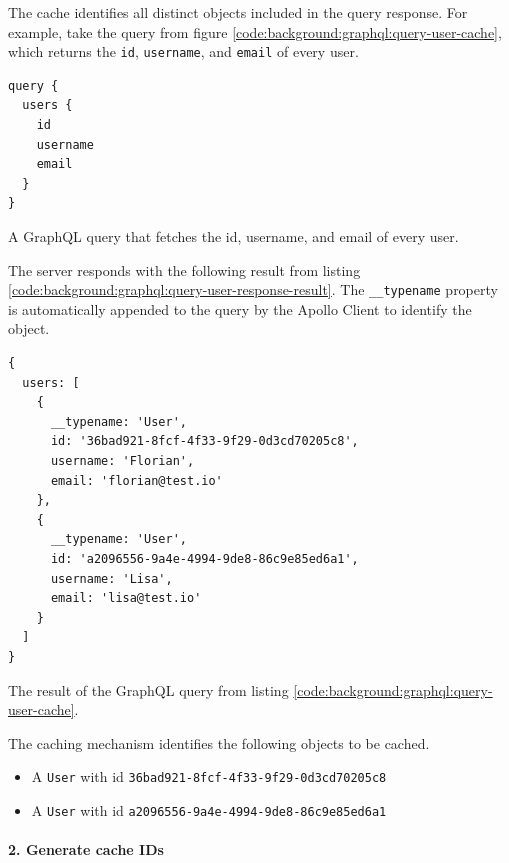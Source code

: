 The cache identifies all distinct objects included in the query response. For example, take the query from figure \ref{code:background:graphql:query-user-cache}, which returns the \texttt{id}, \texttt{username}, and \texttt{email} of every user.

\ifshowListings
\begin{listing}[H]
    \begin{verbatim}
query {
  users {
    id
    username
    email
  }
}
    \end{verbatim}
    \caption{A GraphQL query that fetches the id, username, and email of every user.}\label{code:background:graphql:query-user-cache}
\end{listing}
\fi

\noindent The server responds with the following result from listing \ref{code:background:graphql:query-user-response-result}. The \texttt{\_\_typename} property is automatically appended to the query by the Apollo Client to identify the object.

\ifshowListings
\begin{listing}[H]
    \begin{verbatim}
{
  users: [
    {
      __typename: 'User',
      id: '36bad921-8fcf-4f33-9f29-0d3cd70205c8',
      username: 'Florian',
      email: 'florian@test.io'
    },
    {
      __typename: 'User',
      id: 'a2096556-9a4e-4994-9de8-86c9e85ed6a1',
      username: 'Lisa',
      email: 'lisa@test.io'
    }
  ]
}
    \end{verbatim}
    \caption{The result of the GraphQL query from listing \ref{code:background:graphql:query-user-cache}.}\label{code:background:graphql:query-user-response-result}
\end{listing}
\fi

The caching mechanism identifies the following objects to be cached.

\begin{itemize}
    \item A \texttt{User} with id \texttt{36bad921-8fcf-4f33-9f29-0d3cd70205c8}
    \item A \texttt{User} with id \texttt{a2096556-9a4e-4994-9de8-86c9e85ed6a1}
\end{itemize}

\paragraph{2. Generate cache IDs}\label{paragraph:background:graphql:apollo-server-client:data-normalization:generate-cache-ids}

